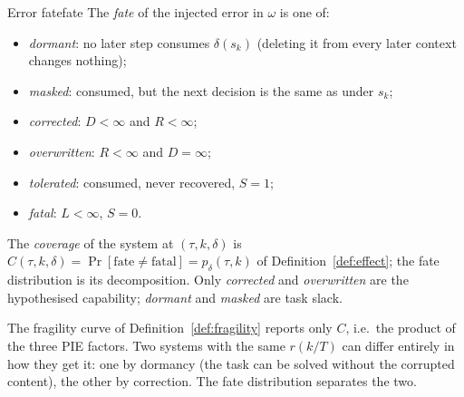 \begin{definition}{Error fate}{fate}
The \emph{fate} of the injected error in $\omega$ is one of:
\begin{itemize}[leftmargin=1.1em]
\item \emph{dormant}: no later step consumes $\delta(s_k)$ (deleting it from every later context changes nothing);
\item \emph{masked}: consumed, but the next decision is the same as under $s_k$;
\item \emph{corrected}: $D<\infty$ and $R<\infty$;
\item \emph{overwritten}: $R<\infty$ and $D=\infty$;
\item \emph{tolerated}: consumed, never recovered, $S{=}1$;
\item \emph{fatal}: $L<\infty$, $S{=}0$.
\end{itemize}
The \emph{coverage} of the system at $(\tau,k,\delta)$ is $C(\tau,k,\delta)=\Pr[\text{fate}\neq\text{fatal}]=p_\delta(\tau,k)$ of Definition~\ref{def:effect}; the fate distribution is its decomposition. Only \emph{corrected} and \emph{overwritten} are the hypothesised capability; \emph{dormant} and \emph{masked} are task slack.
\end{definition}

The fragility curve of Definition~\ref{def:fragility} reports only $C$, i.e.\ the product of the three PIE factors. Two systems with the same $r(k/T)$ can differ entirely in how they get it: one by dormancy (the task can be solved without the corrupted content), the other by correction. The fate distribution separates the two.


